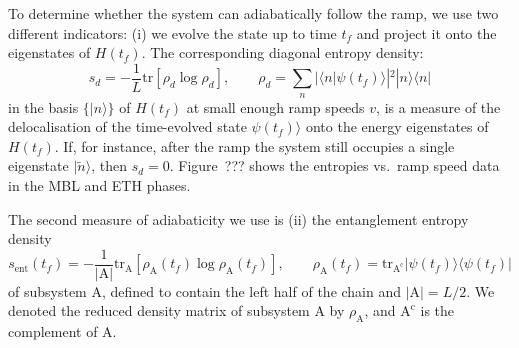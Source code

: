 \documentclass{SciPost}
\newcommand\0{\scalebox{-1}[1]{0}}
\begin{document}
To determine whether the system can adiabatically follow the ramp, we use two different indicators: (i) we evolve the state up to time $t_f$ and project it onto the eigenstates of $H(t_f)$. The corresponding diagonal entropy density:
\begin{equation}
s_d = -\frac{1}{L}\mathrm{tr}\left[\rho_d\log\rho_d\right], \qquad \rho_d=\sum_n |\langle n|\psi(t_f)\rangle|^2 |n\rangle\langle n|
\end{equation}
in the basis $\{|n\rangle\}$ of $H(t_f)$ at small enough ramp speeds $v$, is a measure of the delocalisation of the time-evolved state $\psi(t_f)\rangle$ onto the energy eigenstates of $H(t_f)$. If, for instance, after the ramp the system still occupies a single eigenstate $|\tilde n\rangle$, then $s_d=0$. Figure~??? shows the entropies vs.~ramp speed data in the MBL and ETH phases.

The second measure of adiabaticity we use is (ii) the entanglement entropy density
\begin{equation}
s_\mathrm{ent}(t_f) = -\frac{1}{|\mathrm{A}|}\mathrm{tr}_{\mathrm{A}}\left[\rho_\mathrm{A}(t_f)\log\rho_\mathrm{A}(t_f)\right], \qquad \rho_\mathrm{A}(t_f) = \mathrm{tr}_{\mathrm{A^c}} |\psi(t_f)\rangle\langle\psi(t_f)|
\end{equation}
of subsystem A, defined to contain the left half of the chain and $|\mathrm{A}|=L/2$. We denoted the reduced density matrix of subsystem A by $\rho_\mathrm{A}$, and $\mathrm{A^c}$ is the complement of A.

\end{document}
